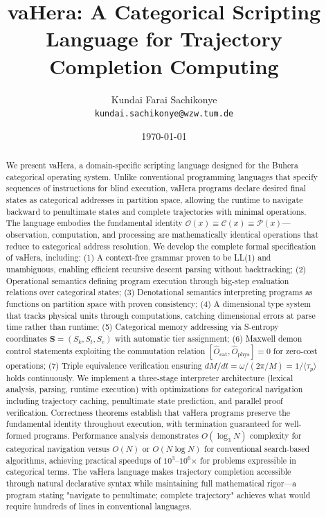 \documentclass[twocolumn,10pt]{article}
\title{vaHera: A Categorical Scripting Language for Trajectory Completion Computing}
\author{
Kundai Farai Sachikonye\\
\texttt{kundai.sachikonye@wzw.tum.de}
}
\date{\today}
\newcommand{\Scoord}{\mathbf{S}}
\theoremstyle{definition}
\theoremstyle{remark}
\begin{document}
\maketitle

\begin{abstract}
We present vaHera, a domain-specific scripting language designed for the Buhera categorical operating system. Unlike conventional programming languages that specify sequences of instructions for blind execution, vaHera programs declare desired final states as categorical addresses in partition space, allowing the runtime to navigate backward to penultimate states and complete trajectories with minimal operations. The language embodies the fundamental identity $\mathcal{O}(x) \equiv \mathcal{C}(x) \equiv \mathcal{P}(x)$—observation, computation, and processing are mathematically identical operations that reduce to categorical address resolution. We develop the complete formal specification of vaHera, including: (1) A context-free grammar proven to be LL(1) and unambiguous, enabling efficient recursive descent parsing without backtracking; (2) Operational semantics defining program execution through big-step evaluation relations over categorical states; (3) Denotational semantics interpreting programs as functions on partition space with proven consistency; (4) A dimensional type system that tracks physical units through computations, catching dimensional errors at parse time rather than runtime; (5) Categorical memory addressing via S-entropy coordinates $\Scoord = (S_k, S_t, S_e)$ with automatic tier assignment; (6) Maxwell demon control statements exploiting the commutation relation $[\hat{O}_{\text{cat}}, \hat{O}_{\text{phys}}] = 0$ for zero-cost operations; (7) Triple equivalence verification ensuring $dM/dt = \omega/(2\pi/M) = 1/\langle\tau_p\rangle$ holds continuously. We implement a three-stage interpreter architecture (lexical analysis, parsing, runtime execution) with optimizations for categorical navigation including trajectory caching, penultimate state prediction, and parallel proof verification. Correctness theorems establish that vaHera programs preserve the fundamental identity throughout execution, with termination guaranteed for well-formed programs. Performance analysis demonstrates $O(\log_3 N)$ complexity for categorical navigation versus $O(N)$ or $O(N \log N)$ for conventional search-based algorithms, achieving practical speedups of $10^3$--$10^6$× for problems expressible in categorical terms. The vaHera language makes trajectory completion accessible through natural declarative syntax while maintaining full mathematical rigor—a program stating "navigate to penultimate; complete trajectory" achieves what would require hundreds of lines in conventional languages.
\end{abstract}
\end{document}
